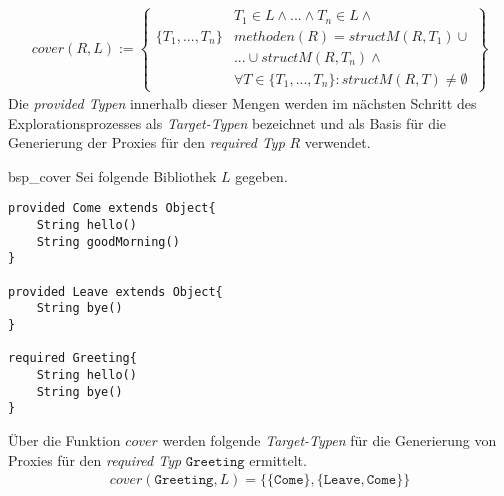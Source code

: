 \begin{gather*}
cover(R,L) := 
\left\{\begin{array}{l|l}
					& T_1 \in L \wedge \text{...} \wedge T_n \in L 								\wedge \mathit{ }\\
\{T_1,...,T_n\}		& \mathit{methoden(R)} = \mathit{structM(R,T_1)}							\cup \mathit{ }\\
					& \texttt{...} \cup \mathit{structM(R, T_n)} 								\wedge \mathit{ }\\
					& \forall T \in \{T_1,...,T_n\}:											\mathit{structM(R,T)} \neq \emptyset
\end{array}\right\}
\end{gather*}
Die \emph{provided Typen} innerhalb dieser Mengen werden im nächsten Schritt des Explorationsprozesses als \emph{Target-Typen} bezeichnet und als Basis für die Generierung der Proxies für den \emph{required Typ} $R$ verwendet. 
\begin{example}{bsp_cover}
Sei folgende Bibliothek $L$ gegeben.
\begin{lstlisting}[style = dsl]
provided Come extends Object{
	String hello()
	String goodMorning()
}

provided Leave extends Object{
	String bye()
}

required Greeting{
	String hello()
	String bye()
}
\end{lstlisting}
Über die Funktion $\mathit{cover}$ werden folgende \emph{Target-Typen} für die Generierung von Proxies für den \emph{required Typ} $\texttt{Greeting}$ ermittelt.
\begin{gather*}
\mathit{cover(\texttt{Greeting},L)} = \{
	\{\texttt{Come}\},\{\texttt{Leave}, \texttt{Come}\}
\}
\end{gather*}
\end{example}

